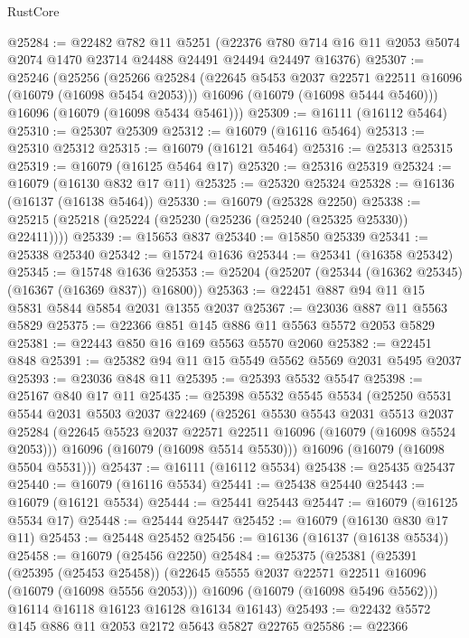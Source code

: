 \begin{lexlean}{RustCore}
\begin{coremodule}
@25284 := @22482
    @782
    @11
    @5251
    (@22376 @780 @714 @16 @11 @2053 @5074 @2074 @1470 @23714 @24488 @24491 @24494 @24497 @16376)
@25307 := @25246
    (@25256
      (@25266
        @25284
        (@22645 @5453 @2037 @22571 @22511 @16096 (@16079 (@16098 @5454 @2053)))
        @16096
        (@16079 (@16098 @5444 @5460)))
      @16096
      (@16079 (@16098 @5434 @5461)))
@25309 := @16111 (@16112 @5464)
@25310 := @25307 @25309
@25312 := @16079 (@16116 @5464)
@25313 := @25310 @25312
@25315 := @16079 (@16121 @5464)
@25316 := @25313 @25315
@25319 := @16079 (@16125 @5464 @17)
@25320 := @25316 @25319
@25324 := @16079 (@16130 @832 @17 @11)
@25325 := @25320 @25324
@25328 := @16136 (@16137 (@16138 @5464))
@25330 := @16079 (@25328 @2250)
@25338 := @25215 (@25218 (@25224 (@25230 (@25236 (@25240 (@25325 @25330)) @22411))))
@25339 := @15653 @837
@25340 := @15850 @25339
@25341 := @25338 @25340
@25342 := @15724 @1636
@25344 := @25341 (@16358 @25342)
@25345 := @15748 @1636
@25353 := @25204 (@25207 (@25344 (@16362 @25345) (@16367 (@16369 @837)) @16800))
@25363 := @22451 @887 @94 @11 @15 @5831 @5844 @5854 @2031 @1355 @2037
@25367 := @23036 @887 @11 @5563 @5829
@25375 := @22366 @851 @145 @886 @11 @5563 @5572 @2053 @5829
@25381 := @22443 @850 @16 @169 @5563 @5570 @2060
@25382 := @22451 @848
@25391 := @25382 @94 @11 @15 @5549 @5562 @5569 @2031 @5495 @2037
@25393 := @23036 @848 @11
@25395 := @25393 @5532 @5547
@25398 := @25167 @840 @17 @11
@25435 := @25398
    @5532
    @5545
    @5534
    (@25250
      @5531
      @5544
      @2031
      @5503
      @2037
      @22469
      (@25261
        @5530
        @5543
        @2031
        @5513
        @2037
        @25284
        (@22645 @5523 @2037 @22571 @22511 @16096 (@16079 (@16098 @5524 @2053)))
        @16096
        (@16079 (@16098 @5514 @5530)))
      @16096
      (@16079 (@16098 @5504 @5531)))
@25437 := @16111 (@16112 @5534)
@25438 := @25435 @25437
@25440 := @16079 (@16116 @5534)
@25441 := @25438 @25440
@25443 := @16079 (@16121 @5534)
@25444 := @25441 @25443
@25447 := @16079 (@16125 @5534 @17)
@25448 := @25444 @25447
@25452 := @16079 (@16130 @830 @17 @11)
@25453 := @25448 @25452
@25456 := @16136 (@16137 (@16138 @5534))
@25458 := @16079 (@25456 @2250)
@25484 := @25375
    (@25381
      (@25391
        (@25395 (@25453 @25458))
        (@22645 @5555 @2037 @22571 @22511 @16096 (@16079 (@16098 @5556 @2053)))
        @16096
        (@16079 (@16098 @5496 @5562)))
      @16114
      @16118
      @16123
      @16128
      @16134
      @16143)
@25493 := @22432 @5572 @145 @886 @11 @2053 @2172 @5643 @5827 @22765
@25586 := @22366

\end{coremodule}
\end{lexlean}
